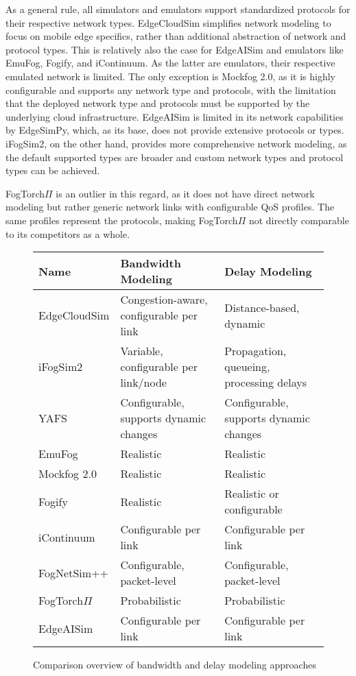 As a general rule, all simulators and emulators support standardized protocols for their respective network types.
EdgeCloudSim simplifies network modeling to focus on mobile edge specifics, rather than additional abstraction of network and protocol types.
This is relatively also the case for EdgeAISim and emulators like EmuFog, Fogify, and iContinuum.
As the latter are emulators, their respective emulated network is limited.
The only exception is Mockfog 2.0, as it is highly configurable and supports any network type and protocols, with the limitation that the deployed network type and protocols must be supported by the underlying cloud infrastructure.
EdgeAISim is limited in its network capabilities by EdgeSimPy, which, as its base, does not provide extensive protocols or types.
iFogSim2, on the other hand, provides more comprehensive network modeling, as the default supported types are broader and custom network types and protocol types can be achieved.

FogTorch$\Pi$ is an outlier in this regard, as it does not have direct network modeling but rather generic network links with configurable QoS profiles.
The same profiles represent the protocols, making FogTorch$\Pi$ not directly comparable to its competitors as a whole.

\begin{figure}[H]
  \centering
  \begin{tabularx}{\textwidth}{l | X | X }
    \hline
    \textbf{Name} & \textbf{Bandwidth Modeling} & \textbf{Delay Modeling} \\
    \hline\hline
    EdgeCloudSim  & Congestion-aware, configurable per link & Distance-based, dynamic\\\hline
    iFogSim2      & Variable, configurable per link/node    & Propagation, queueing, processing delays\\\hline
    YAFS          & Configurable, supports dynamic changes  & Configurable, supports dynamic changes\\\hline
    EmuFog        & Realistic                               & Realistic\\\hline
    Mockfog 2.0   & Realistic                               & Realistic\\\hline
    Fogify        & Realistic                               & Realistic or configurable \\\hline
    iContinuum    & Configurable per link                   & Configurable per link \\\hline
    FogNetSim++   & Configurable, packet-level              & Configurable, packet-level\\\hline
    FogTorch$\Pi$ & Probabilistic                           & Probabilistic\\\hline
    EdgeAISim     & Configurable per link                   & Configurable per link\\\hline
  \end{tabularx}
  \caption{Comparison overview of bandwidth and delay modeling approaches}
  \label{tab:analysis-network-characteristics}
\end{figure}

